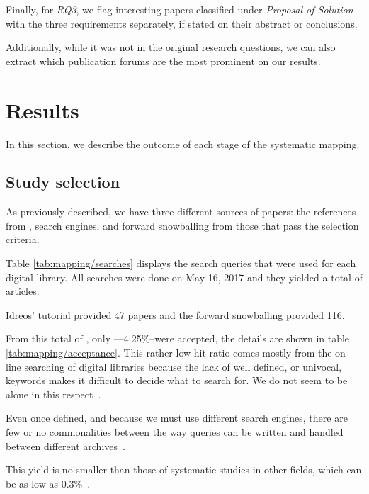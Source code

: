 Finally, for \emph{RQ3}, we flag interesting papers classified under
\emph{Proposal of Solution} with the three requirements separately, if stated
on their abstract or conclusions.

Additionally, while it was not in the original research questions, we can
also extract which publication forums are the most prominent on our results.

\section{Results}
\label{sec:mapping/results}
In this section, we describe the outcome of each stage of the systematic mapping.

\subsection{Study selection}
As previously described, we have three different sources of papers:
the references from \cite{Idreos2015}, search engines, and forward snowballing
from those that pass the selection criteria.

Table \ref{tab:mapping/searches} displays the search queries that were used for
each digital library.
All searches were done on May 16, 2017 and they yielded a total of  articles.

Idreos' tutorial provided 47 papers and the forward snowballing provided 116.

From this total of , only ---4.25\%--were accepted, the details are
shown in table \ref{tab:mapping/acceptance}. This rather low hit ratio
comes mostly from the on-line searching of digital libraries
because the lack of well defined, or univocal, keywords makes it difficult to decide what
to search for. We do not seem to be alone in this respect~\cite{Kitchenham2013,Jorgensen2007}.

Even once defined, and because we must use different search engines, there are
few or no commonalities between the way queries can be written and handled
between different archives~\cite{Bailey2007, Brereton2007}.

This yield is no smaller than those of systematic studies in
other fields, which can be as low as 0.3\%~\cite{Oakley2003}.

